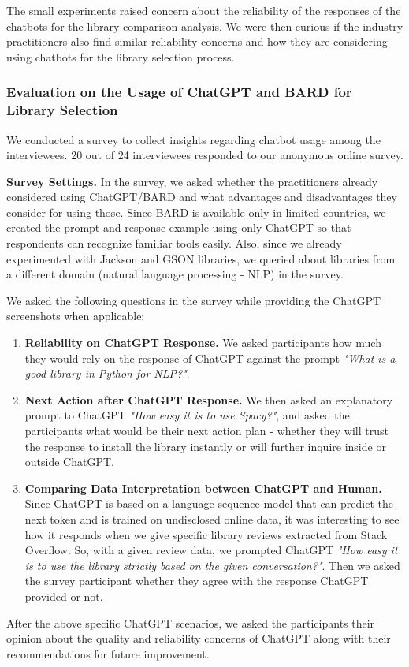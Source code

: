 The small experiments raised concern about the reliability of the responses of the chatbots for the library comparison analysis. We were then curious if the industry practitioners also find similar reliability concerns and how they are considering using chatbots for the library selection process.


\subsubsection{Evaluation on the Usage of ChatGPT and BARD for Library Selection}
We conducted a survey to collect insights regarding chatbot usage among the interviewees. 20 out of 24 interviewees responded to our anonymous online survey.

\textbf{Survey Settings.} In the survey, we asked whether the practitioners already considered using ChatGPT/BARD and what advantages and disadvantages they consider for using those. Since BARD is available only in limited countries, we created the prompt and response example using only ChatGPT so that respondents can recognize familiar tools easily. Also, since we already experimented with Jackson and GSON libraries, we queried about libraries from a different domain (natural language processing - NLP) in the survey.

We asked the following questions in the survey while providing the ChatGPT screenshots when applicable:
\begin{enumerate}
    \item \textbf{Reliability on ChatGPT Response.} We asked participants how much they would rely on the response of ChatGPT against the prompt \textit{"What is a good library in Python for NLP?"}.
    \item \textbf{Next Action after ChatGPT Response.} We then asked an explanatory prompt to ChatGPT \textit{"How easy it is to use Spacy?"}, and asked the participants what would be their next action plan - whether they will trust the response to install the library instantly or will further inquire inside or outside ChatGPT.
    \item \textbf{Comparing Data Interpretation between ChatGPT and Human.} Since ChatGPT is based on a language sequence model that can predict the next token and is trained on undisclosed online data, it was interesting to see how it responds when we give specific library reviews extracted from Stack Overflow. So, with a given review data, we prompted ChatGPT \textit{"How easy it is to use the library strictly based on the given conversation?"}. Then we asked the survey participant whether they agree with the response ChatGPT provided or not.
\end{enumerate}
After the above specific ChatGPT scenarios, we asked the participants their opinion about the quality and reliability concerns of ChatGPT along with their recommendations for future improvement.

